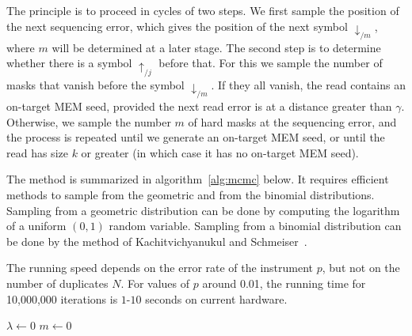 \documentclass{article}
\begin{document}
The principle is to proceed in cycles of two steps. We first sample the
position of the next sequencing error, which gives the position of the
next symbol $\downarrow_{/m}$, where $m$ will be determined at a later
stage. The second step is to determine whether there is a symbol
$\uparrow_{/j}$ before that. For this we sample the number of masks that
vanish before the symbol $\downarrow_{/m}$. If they all vanish, the read
contains an on-target MEM seed, provided the next read error is at a
distance greater than $\gamma$. Otherwise, we sample the number $m$ of
hard masks at the sequencing error, and the process is repeated until we
generate an on-target MEM seed, or until the read has size $k$ or greater
(in which case it has no on-target MEM seed).

The method is summarized in algorithm~\ref{alg:mcmc} below. It requires
efficient methods to sample from the geometric and from the binomial
distributions. Sampling from a geometric distribution can be done by
computing the logarithm of a uniform $(0,1)$ random variable. Sampling
from a binomial distribution can be done by the method of
Kachitvichyanukul and Schmeiser~\cite{kachitvichyanukul1988binomial}.

The running speed depends on the error rate of the instrument $p$, but not
on the number of duplicates $N$. For values of $p$ around 0.01,
the running time for 10,000,000 iterations is $1$-$10$ seconds on current
hardware.

\begin{algorithm}[H]
\label{alg:mcmc}
\SetAlgoLined
{}
  $\lambda \leftarrow 0$ 
  $m \leftarrow 0$ 
\end{algorithm}
\end{document}
